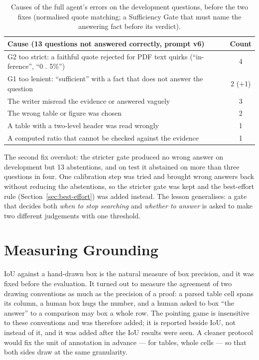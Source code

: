 \begin{table}[htbp]
\centering
\small
\begin{tabular}{p{9.5cm}c}
\toprule
Cause (13 questions not answered correctly, prompt v6) & Count \\
\midrule
G2 too strict: a faithful quote rejected for PDF text quirks (``in- ference'', ``0 . 5\%'') & 4 \\
G1 too lenient: ``sufficient'' with a fact that does not answer the question & 2 (+1) \\
The writer misread the evidence or answered vaguely & 3 \\
The wrong table or figure was chosen & 2 \\
A table with a two-level header was read wrongly & 1 \\
A computed ratio that cannot be checked against the evidence & 1 \\
\bottomrule
\end{tabular}
\caption{Causes of the full agent's errors on the development questions, before the
two fixes (normalised quote matching; a Sufficiency Gate that must name the answering
fact before its verdict).}
\label{tab:dev-errors}
\end{table}

The second fix overshot: the stricter gate produced no wrong answer on development but
13 abstentions, and on test it abstained on more than three questions in four. One
calibration step was tried and brought wrong answers back without reducing the
abstentions, so the stricter gate was kept and the best-effort rule
(Section~\ref{sec:best-effort}) was added instead. The lesson generalises: a gate that
decides both \emph{when to stop searching} and \emph{whether to answer} is asked to
make two different judgements with one threshold.

\section{Measuring Grounding}

IoU against a hand-drawn box is the natural measure of box precision, and it was
fixed before the evaluation. It turned out to measure the agreement of two drawing
conventions as much as the precision of a proof: a parsed table cell spans its
column, a human box hugs the number, and a human asked to box ``the answer'' to a
comparison may box a whole row. The pointing game is insensitive to these conventions
and was therefore added; it is reported beside IoU, not instead of it, and it was added
after the IoU results were seen. A cleaner protocol would fix the unit of annotation in
advance --- for tables, whole cells --- so that both sides draw at the same
granularity.

